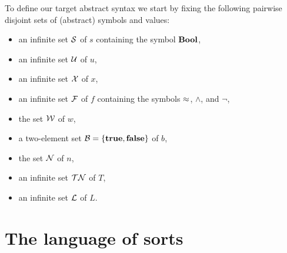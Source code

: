 To define our target abstract syntax we start by fixing the following pairwise disjoint
sets of (abstract) symbols and values:
\begin{itemize}
\item
an infinite set $\mathcal{S}$ of  $s$ 
containing the symbol $\textbf{Bool}$,

\item
an infinite set $\mathcal{U}$ of  $u$,

\item
an infinite set $\mathcal{X}$ of  $x$,

\item
an infinite set $\mathcal{F}$ of  $f$
containing the symbols $\approx$, $\land$, and $\lnot$,



%
\item
the set $\mathcal{W}$ of  $w$,

\item
a two-element set $\mathcal{B} = \{\textbf{true}, \textbf{false}\}$ of  $b$,

\item
the set $\mathcal{N}$ of  $n$,

\item
an infinite set $\mathcal{TN}$ of  $T$,

\item
an infinite set $\mathcal{L}$ of  $L$.


\end{itemize}


\section{The language of sorts}

